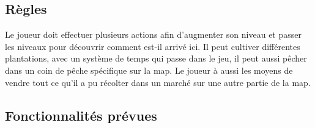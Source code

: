 \documentclass{article}
\begin{document}
\begin{titlepage}
\subsection{Règles}

Le joueur doit effectuer plusieurs actions afin d'augmenter son niveau et passer les niveaux pour découvrir comment est-il arrivé ici. Il peut cultiver différentes plantations, avec un système de temps qui passe dans le jeu, il peut aussi pêcher dans un coin de pêche spécifique sur la map. Le joueur à aussi les moyens de vendre tout ce qu'il a pu récolter dans un marché sur une autre partie de la map.%
\subsection{Fonctionnalités prévues}


\end{titlepage}
\end{document}
